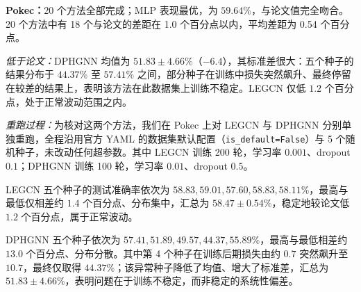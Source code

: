 \documentclass[11pt,a4paper]{article}
\begin{document}
\par\smallskip
\noindent\textbf{Pokec：}20 个方法全部完成；MLP 表现最优，为 $59.64\%$，与论文值完全吻合。20 个方法中有 18 个与论文的差距在 1.0 个百分点以内，平均差距为 0.54 个百分点。

\noindent\textit{低于论文：}DPHGNN 均值为 $51.83\pm4.66\%$（$-6.4$），其标准差很大：五个种子的结果分布于 $44.37\%$ 至 $57.41\%$ 之间，部分种子在训练中损失突然飙升、最终停留在较差的结果上，表明该方法在此数据集上训练不稳定。LEGCN 仅低 $1.2$ 个百分点，处于正常波动范围之内。

\noindent\textit{重跑过程：}为核对这两个方法，我们在 Pokec 上对 LEGCN 与 DPHGNN 分别单独重跑，全程沿用官方 YAML 的数据集默认配置（\texttt{is\_default=False}）与 5 个随机种子，未改动任何超参数。其中 LEGCN 训练 200 轮，学习率 $0.001$、dropout $0.1$；DPHGNN 训练 100 轮，学习率 $0.01$、dropout $0.5$。

LEGCN 五个种子的测试准确率依次为 $58.83, 59.01, 57.60, 58.83, 58.11\%$，最高与最低仅相差约 $1.4$ 个百分点、分布集中，汇总为 $58.47\pm0.54\%$，稳定地较论文低 $1.2$ 个百分点，属于正常波动。

DPHGNN 五个种子依次为 $57.41, 51.89, 49.57, 44.37, 55.89\%$，最高与最低相差约 $13.0$ 个百分点、分布分散。其中第 4 个种子在训练后期损失由约 $0.7$ 突然飙升至 $10.7$，最终仅取得 $44.37\%$；该异常种子降低了均值、增大了标准差，汇总为 $51.83\pm4.66\%$，表明问题在于训练不稳定，而非稳定的系统性偏差。
\end{document}
